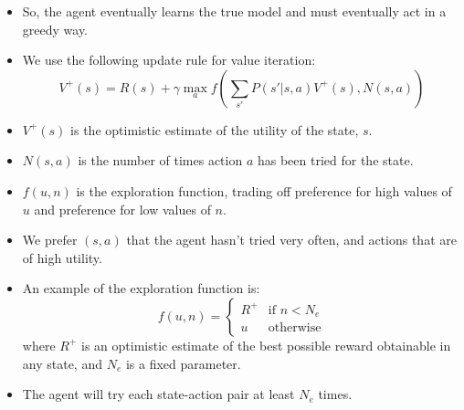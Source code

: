 \documentclass{article}
\begin{document}
\begin{itemize}
\begin{itemize}
            \item So, the agent eventually learns the true model and must eventually act in a greedy way.
            \item We use the following update rule for value iteration:
                \[
                    V^+(s) = R(s) + \gamma \max_a f(\sum_{s'} P(s' | s, a) V^+(s), N(s, a))
                \]
            \item $V^+(s)$ is the optimistic estimate of the utility of the state, $s$.
            \item $N(s, a)$ is the number of times action $a$ has been tried for the state.
            \item $f(u, n)$ is the exploration function, trading off preference for high values of $u$ and preference for low values of $n$.
            \item We prefer $(s, a)$ that the agent hasn't tried very often, and actions that are of high utility.
            \item An example of the exploration function is:
                \[
                    f(u, n) = \begin{cases}R^+ &\text{if $n < N_e$} \\ u &\text{otherwise}\end{cases}
                \]
                where $R^+$ is an optimistic estimate of the best possible reward obtainable in any state, and $N_e$ is a fixed parameter.
            \item The agent will try each state-action pair at least $N_e$ times.
        \end{itemize}
\end{itemize}
\end{document}
